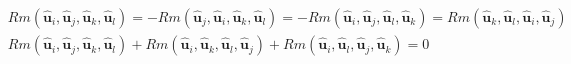 \documentclass{article}
\begin{document}
\begin{align}
&Rm(\widehat{\boldsymbol{u}}_i,\widehat{\boldsymbol{u}}_j,\widehat{\boldsymbol{u}}_k,\widehat{\boldsymbol{u}}_l)=-Rm(\widehat{\boldsymbol{u}}_j,\widehat{\boldsymbol{u}}_i,\widehat{\boldsymbol{u}}_k,\widehat{\boldsymbol{u}}_l)=-Rm(\widehat{\boldsymbol{u}}_i,\widehat{\boldsymbol{u}}_j,\widehat{\boldsymbol{u}}_l,\widehat{\boldsymbol{u}}_k)=Rm(\widehat{\boldsymbol{u}}_k,\widehat{\boldsymbol{u}}_l,\widehat{\boldsymbol{u}}_i,\widehat{\boldsymbol{u}}_j)\\
&Rm(\widehat{\boldsymbol{u}}_i,\widehat{\boldsymbol{u}}_j,\widehat{\boldsymbol{u}}_k,\widehat{\boldsymbol{u}}_l)+Rm(\widehat{\boldsymbol{u}}_i,\widehat{\boldsymbol{u}}_k,\widehat{\boldsymbol{u}}_l,\widehat{\boldsymbol{u}}_j)+Rm(\widehat{\boldsymbol{u}}_i,\widehat{\boldsymbol{u}}_l,\widehat{\boldsymbol{u}}_j,\widehat{\boldsymbol{u}}_k)=0
\end{align}
\end{document}
